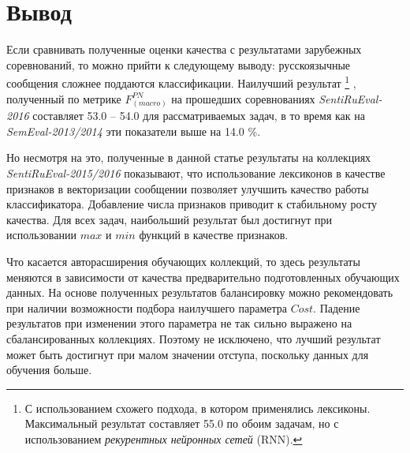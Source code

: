 \section*{Вывод}
Если сравнивать полученные оценки качества с результатами зарубежных
соревнований, то можно прийти к следующему выводу: русскоязычные сообщения
сложнее поддаются классификации.
Наилучший результат \footnote{
    С использованием схожего подхода, в котором применялись лексиконы.
    Максимальный результат составляет 55.0 по обоим задачам, но с использованием
    {\it рекурентных нейронных сетей} (RNN).
}
, полученный по метрике $F_{(macro)}^{PN}$ на
прошедших соревнованиях {\it SentiRuEval-2016} составляет 53.0 -- 54.0
для рассматриваемых задач, в то время как на {\it SemEval-2013/2014} эти
показатели выше на 14.0 \%.

Но несмотря на это, полученные в данной статье результаты на коллекциях {\it SentiRuEval-2015/2016}
показывают, что использование лексиконов в качестве признаков в векторизации
сообщении позволяет улучшить качество работы классификатора.
Добавление числа признаков приводит к стабильному росту качества.
Для всех задач, наибольший результат был достигнут при использовании $max$ и $min$ функций
в качестве признаков.

Что касается авторасширения обучающих коллекций, то здесь результаты меняются
в зависимости от качества предварительно подготовленных обучающих данных.
На основе полученных результатов балансировку можно рекомендовать при наличии
возможности подбора наилучшего параметра $Cost$.
Падение результатов при изменении этого параметра не так сильно
выражено на сбалансированных коллекциях.
Поэтому не исключено, что лучший результат может быть достигнут при малом
значении отступа, поскольку данных для обучения больше.
